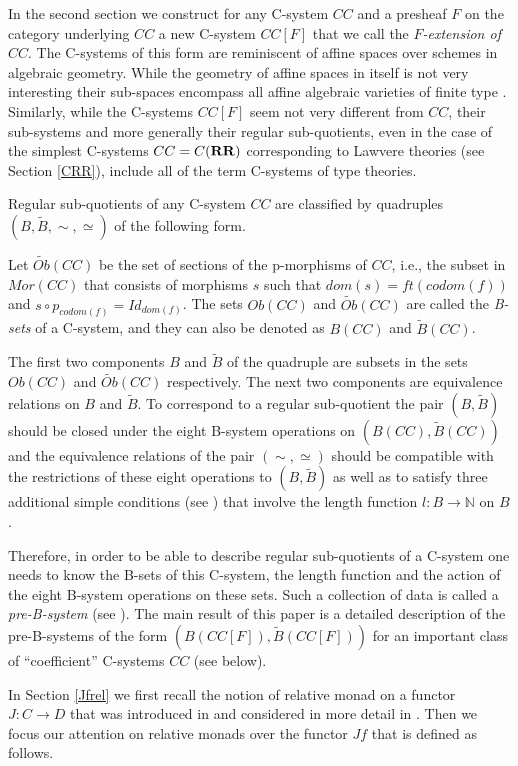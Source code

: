 \documentclass[onecolumn,12pt]{amsart}
\numberwithin{proposition}{subsection}
\newcommand{\sr}{\rightarrow}
\newcommand{\nn}{{\mathbb N}}
\newcommand{\nat}{\nn}
\newcommand{\wt}{\widetilde}
\newcommand{\RR}{{\bf RR}}
\begin{document}
In the second section we construct for any C-system $CC$ and a presheaf $F$ on
the category underlying $CC$ a new C-system $CC[F]$ that we call the
{\em $F$-extension of $CC$}. The C-systems of this form are reminiscent of affine
spaces over schemes in algebraic geometry. While the geometry of affine spaces
in itself is not very interesting their sub-spaces encompass all affine
algebraic varieties of finite type . Similarly, while the C-systems $CC[F]$
seem not very different from $CC$, their sub-systems and more generally their
regular sub-quotients, even in the case of the simplest C-systems $CC=C(\RR)$
corresponding to Lawvere theories (see Section \ref{CRR}), include all of the
term C-systems of type theories.

Regular sub-quotients of any C-system $CC$ are classified by quadruples
$(B,\wt{B}, \sim,\simeq)$ of the following form.

Let $\wt{Ob}(CC)$ be the set of sections of the p-morphisms of $CC$, i.e., the
subset in $Mor(CC)$ that consists of morphisms $s$ such that
$dom(s)=ft(codom(f))$ and $s\circ p_{codom(f)}=Id_{dom(f)}$.  The sets $Ob(CC)$
and $\wt{Ob}(CC)$ are called the {\em B-sets} of a C-system, and they can also be denoted
as $B(CC)$ and $\wt{B}(CC)$.

The first two components $B$ and $\wt{B}$ of the quadruple are subsets in the
sets $Ob(CC)$ and $\wt{Ob}(CC)$ respectively. The next two components are
equivalence relations on $B$ and $\wt{B}$. To correspond to a regular
sub-quotient the pair $(B,\wt{B})$ should be closed under the eight B-system
operations on $(B(CC),\wt{B}(CC))$ and the equivalence relations of the pair
$(\sim,\simeq)$ should be compatible with the restrictions of these eight
operations to $(B,\wt{B})$ as well as to satisfy three additional simple
conditions (see \cite[Proposition 5.4]{Csubsystems}) that involve the length
function $l:B\sr\nat$ on $B$.

Therefore, in order to be able to describe regular sub-quotients of a C-system
one needs to know the B-sets of this C-system, the length function and the
action of the eight B-system operations on these sets. Such a collection of
data is called a {\em pre-B-system} (see \cite{Bsystems}). The main result of this
paper is a detailed description of the pre-B-systems of the form
$(B(CC[F]),\wt{B}(CC[F]))$ for an important class of ``coefficient''
C-systems $CC$ (see below).

In Section \ref{Jfrel} we first recall the notion of relative monad on a
functor $J:C\sr D$ that was introduced in \cite[Def.1, p.~299]{ACU} and
considered in more detail in \cite{ACU2}. Then we focus our attention on
relative monads over the functor $Jf$ that is defined as follows.
\end{document}
